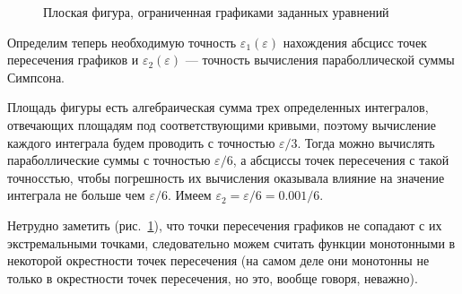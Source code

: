 \documentclass[a4paper,12pt,titlepage,finall]{article}
\begin{document}
\begin{figure}[h]
\centering
{}
\caption{Плоская фигура, ограниченная графиками заданных уравнений}
\label{plot1}
\end{figure}

Определим теперь необходимую точность $\varepsilon_1(\varepsilon)$ нахождения абсцисс точек пересечения графиков и $\varepsilon_2(\varepsilon)$ — точность вычисления параболлической суммы Симпсона. 

Площадь фигуры есть алгебраическая сумма трех определенных интегралов, отвечающих площадям под соответствующими кривыми, поэтому вычисление каждого интеграла будем проводить с точностью $\varepsilon/3$. Тогда можно вычислять параболлические суммы с точностью $\varepsilon/6$, а абсциссы точек пересечения с такой точносстью, чтобы погрешность их вычисления оказывала влияние на значение интеграла не больше чем $\varepsilon/6$. Имеем $\varepsilon_2=\varepsilon/6=0.001/6$.

Нетрудно заметить (рис.~\ref{plot1}), что точки пересечения графиков не сопадают с их экстремальными точками, следовательно можем считать функции монотонными в некоторой окрестности точек пересечения (на самом деле они монотонны не только в окрестности точек пересечения, но это, вообще говоря, неважно). 
\end{document}
